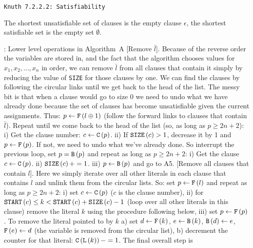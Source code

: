 \def\newstep#1{\smallskip \noindent {\bf #1}}
\def\newprob#1{\vskip 0.08in \noindent {\bf #1}}

\topglue 0.5in
\centerline{\tt Knuth 7.2.2.2: Satisfiability}
\vskip 0.3in

\newprob {Problem 1} The shortest unsatisfiable set of clauses is the
empty clause $\epsilon$, the shortest satisfiable set is the empty set $\emptyset$.

\newprob {Problem 121}: Lower level operations in Algorithm~A
\newstep {A3} [Remove $\bar l$].  Because of the reverse order the variables are
stored in, and the fact that the algorithm chooses values for $x_1, x_2, \ldots, x_n$
in order, we can remove $\bar l$ from all clauses that contain it simply by
reducing the value of {\tt SIZE} for those clauses by one.  We can find the clauses
by following the circular links until we get back to the head of the list.
The messy bit is that when a clause would go to size 0 we need to undo
what we have already done because the set of clauses has become unsatisfiable
given the current assignments.  Thus: $p \gets {\tt F}\left(l \oplus 1\right)$ 
(follow the forward links to clauses that contain $\bar l$).  Repeat until
we come back to the head of the list (so, as long as $p \ge 2 n + 2$):
i) Get the clause number: $c \gets {\tt C}\left(p\right)$. ii) If ${\tt SIZE}\left(c\right) > 1$,
 decrease it by 1 and $p \gets {\tt F}\left(p\right)$.  If not, we need to undo what
 we've already done.  So interrupt the previous
 loop, set $p = {\tt B}\left(p\right)$ and repeat as long as $p \ge 2 n + 2$:
 i) Get the clause $c \gets {\tt C}\left(p\right)$. ii) ${\tt SIZE}\left(c\right) += 1$.
 iii) $p \gets {\tt B}\left(p\right)$ and go to A5.
\newstep {A4} [Remove all clauses that contain $l$].  Here we simply iterate
over all other literals in each clause that contains $l$ and unlink them from
the circular lists.  So: set $p \gets {\tt F}\left(l\right)$ and repeat as
long as $p \ge 2 n + 2$: i) set $c \gets {\tt C}\left(p\right)$ ($c$ is
the clause number), ii) for ${\tt START}\left(c\right) \le k < {\tt START}\left(c\right)
 + {\tt SIZE}\left(c\right) - 1$ (loop over all other literals in this clause)
 remove the literal $k$ using the procedure following below, iii) set $p \gets {\tt F}\left(p\right)$.
 To remove the literal pointed to by $k$ a) set $d \gets {\tt F}\left(k\right)$,
 $e \gets {\tt B}\left(k\right)$, ${\tt B}\left(d\right) \gets e$, ${\tt F}\left(e\right) \gets d$
 (the variable is removed from the circular list), b) decrement the counter for that
 literal: ${\tt C}\left({\tt L}\left(k\right)\right) -= 1$. The final overall step is
